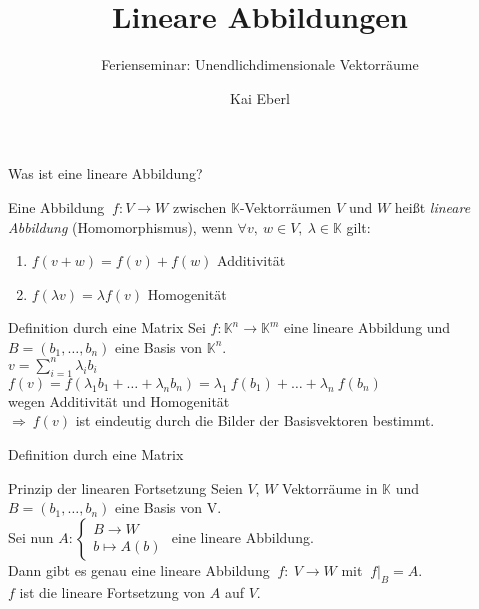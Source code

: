\documentclass[AERbeamer%
,handout%
,optBeamerClassicFormat%
,optLeftEquations   %
]{AERlatex}
\title{Lineare Abbildungen}%
\subtitle{Ferienseminar: Unendlichdimensionale Vektorräume}%
\author{Kai Eberl}%
\date{\AERutilsDate{5}{9}{2022}}%
\begin{document}
%
%
    \AERbeamerTitlePageDefault%
%
    \begin{frame}{Was ist eine lineare Abbildung?}%
        \begin{Definition}
            Eine Abbildung $~f: V \rightarrow W$ zwischen $\mathbb{K}$-Vektorräumen $V$ und $W$ heißt \emph{lineare Abbildung} (Homomorphismus), wenn $\forall v, ~ w \in V, ~ \lambda \in \mathbb{K}$ gilt: \\ \pause
            \begin{enumerate}
                [label=$(\roman*)$, leftmargin=2em]
                \item $f(v+w) = f(v) + f(w)$ \hspace{2em} Additivität \pause
                \item $f(\lambda v) = \lambda f(v)$ \hspace{6em} Homogenität
            \end{enumerate}
        \end{Definition}
    \end{frame}%
%
    \begin{frame}{Definition durch eine Matrix}
        \setlength{\baselineskip}{1.6\baselineskip}
%
        Sei $f: \mathbb{K}^n \rightarrow \mathbb{K}^m$ eine lineare Abbildung und $B=(b_1, \dots , b_n)$ eine Basis von $\mathbb{K}^n$. \\
        $v = \sum_{i=1}^n \lambda_i b_i$ \\ \pause
        $f(v) = f(\lambda_1 b_1 + \dots + \lambda_n b_n) = \lambda_1 ~ f(b_1) + \dots + \lambda_n ~ f(b_n)$ \\
        \hspace{2em}wegen Additivität und Homogenität \\ \pause
        $\Rightarrow ~ f(v)$ ist eindeutig durch die Bilder der Basisvektoren bestimmt.
    \end{frame}
%
    \begin{frame}{Definition durch eine Matrix}
        \begin{block}{Prinzip der linearen Fortsetzung}
            \setlength{\baselineskip}{1.3\baselineskip}
            Seien $V$, $W$ Vektorräume in $\mathbb{K}$ und $B=(b_1, \dots, b_n)$ eine Basis von V. \\
            Sei nun $A:\left\{\begin{array}{l}
                                  B \rightarrow W \\ b \mapsto A(b)
            \end{array} \right.$ eine lineare Abbildung.                                           \\
            Dann gibt es genau eine lineare Abbildung $~ f: ~ V \rightarrow W$ mit $~ f|_B = A$. \\
            $f$ ist die lineare Fortsetzung von $A$ auf $V$.
        \end{block}
    \end{frame}
\end{document}

